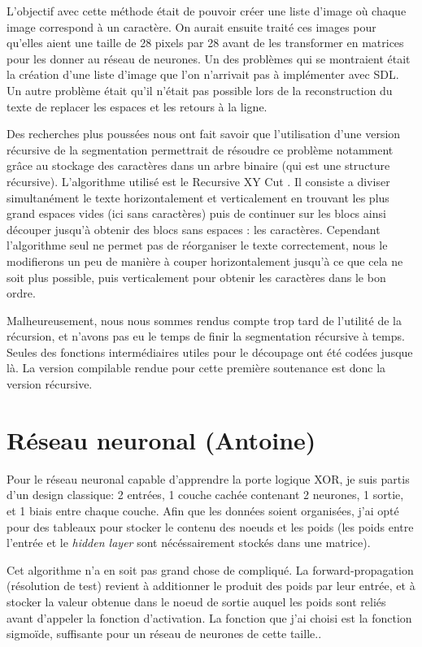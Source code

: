\documentclass[12pt]{report}
\begin{document}
\newpage
L'objectif avec cette méthode était de pouvoir créer une liste d'image où chaque image correspond à un caractère. On aurait ensuite traité ces images pour qu'elles aient une taille de 28 pixels par 28 avant de les transformer en matrices pour les donner au réseau de neurones. Un des problèmes qui se montraient était la création d'une liste d'image que l'on n'arrivait pas à implémenter avec SDL. Un autre problème était qu'il n'était pas possible lors de la reconstruction du texte de replacer les espaces et les retours à la ligne.

Des recherches plus poussées nous ont fait savoir que l'utilisation d'une version récursive de la segmentation permettrait de résoudre ce problème notamment grâce au stockage des caractères dans un arbre binaire (qui est une structure récursive). L'algorithme utilisé est le Recursive XY Cut . Il consiste a diviser simultanément le texte horizontalement et verticalement en trouvant les plus grand espaces vides (ici sans caractères) puis de continuer sur les blocs ainsi découper jusqu'à obtenir des blocs sans espaces : les caractères. Cependant l'algorithme seul ne permet pas de réorganiser le texte correctement, nous le modifierons un peu de manière à couper horizontalement jusqu'à ce que cela ne soit plus possible, puis verticalement pour obtenir les caractères dans le bon ordre.

Malheureusement, nous nous sommes rendus compte trop tard de l'utilité de la récursion, et n'avons pas eu le temps de finir la segmentation récursive à temps. Seules des fonctions intermédiaires utiles pour le découpage ont été codées jusque là. La version compilable rendue pour cette première soutenance est donc la version récursive.

\newpage
\section{Réseau neuronal (Antoine)}

Pour le réseau neuronal capable d'apprendre la porte logique XOR, je suis partis d'un design classique: 2 entrées, 1 couche cachée contenant 2 neurones, 1 sortie, et 1 biais entre chaque couche. Afin que les données soient organisées, j'ai opté pour des tableaux pour stocker le contenu des noeuds et les poids (les poids entre l'entrée et le \textit{hidden layer} sont nécéssairement stockés dans une matrice). 

Cet algorithme n'a en soit pas grand chose de compliqué. La forward-propagation (résolution de test) revient à additionner le produit des poids par leur entrée, et à stocker la valeur obtenue dans le noeud de sortie auquel les poids sont reliés avant d'appeler la fonction d'activation. La fonction que j'ai choisi est la fonction sigmoïde, suffisante pour un réseau de neurones de cette taille..
\end{document}
